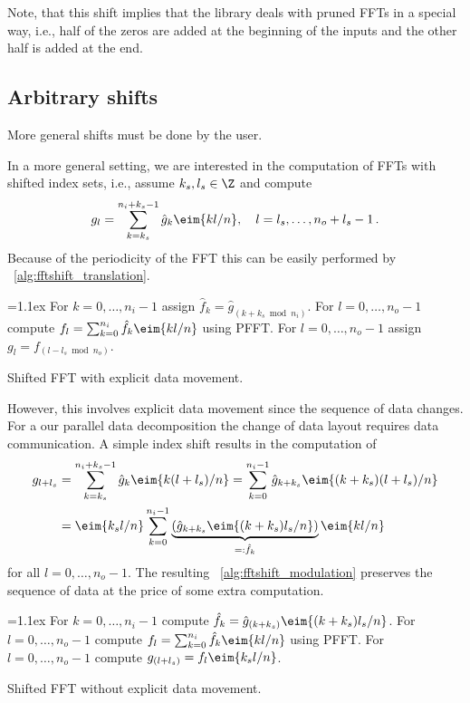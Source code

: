 Note, that this shift implies that the library deals with pruned FFTs in a special way, i.e., half of the zeros are added
at the beginning of the inputs and the other half is added at the end.


\subsection{Arbitrary shifts}
More general shifts must be done by the user.


In a more general setting, we are interested in the computation of FFTs with shifted index sets, i.e., assume $k_s,l_s\in\Z$ and compute
\begin{equation*}
  g_l = \sum_{k=k_s}^{n_i+k_s-1} \hat g_k \eim{kl/n},
  \quad l=l_s,\hdots,n_o+l_s-1\,.
\end{equation*}
Because of the periodicity of the FFT this can be easily performed by \algname~\ref{alg:fftshift_translation}.
\begin{algorithm}\label{alg:fftshift_translation}
  \begin{algorithmic}[1]
    \itemsep=1.1ex
    \State For $k=0,\hdots,n_i-1$ assign $\hat f_k = \hat g_{(k+k_s\bmod n_i)}$.
    \State For $l=0,\hdots,n_o-1$ compute $f_l = \sum_{k=0}^{n_i} \hat f_k \eim{kl/n}$ using PFFT.
    \State For $l=0,\hdots,n_o-1$ assign $g_l = f_{(l-l_s\bmod n_o)}$.
  \end{algorithmic}
  \caption{Shifted FFT with explicit data movement.}
\end{algorithm}
However, this involves explicit data movement since the sequence of data changes.
For a our parallel data decomposition the change of data layout requires data communication.
A simple index shift results in the computation of
\begin{align*}
  g_{l+l_s}
  &=
    \sum_{k=k_s}^{n_i+k_s-1} \hat g_k \eim{k(l+l_s)/n}
    =
    \sum_{k=0}^{n_i-1} \hat g_{k+k_s} \eim{(k+k_s)(l+l_s)/n} \\
  &=
    \eim{k_sl/n} \sum_{k=0}^{n_i-1} \underbrace{\left(\hat g_{k+k_s}\eim{(k+k_s)l_s/n}\right)}_{=: \hat f_k} \eim{kl/n}
\end{align*}
for all $l=0,\hdots,n_o-1$. The resulting \algname~\ref{alg:fftshift_modulation} preserves the sequence of
data at the price of some extra computation.
\begin{algorithm}\label{alg:fftshift_modulation}
  \begin{algorithmic}[1]
    \itemsep=1.1ex
    \State For $k=0,\hdots,n_i-1$ compute $\hat f_k = \hat g_{(k+k_s)} \eim{(k+k_s)l_s/n}$.
    \State For $l=0,\hdots,n_o-1$ compute $f_l = \sum_{k=0}^{n_i} \hat f_k \eim{kl/n}$ using PFFT.
    \State For $l=0,\hdots,n_o-1$ compute $g_{(l+l_s)} = f_l \eim{k_sl/n}$.
  \end{algorithmic}
  \caption{Shifted FFT without explicit data movement.}
\end{algorithm}

